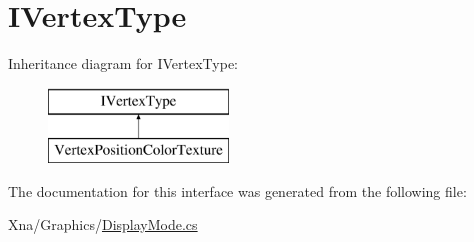 \hypertarget{interfaceMicrosoft_1_1Xna_1_1Framework_1_1Graphics_1_1IVertexType}{}\section{I\+Vertex\+Type}
\label{interfaceMicrosoft_1_1Xna_1_1Framework_1_1Graphics_1_1IVertexType}
Inheritance diagram for I\+Vertex\+Type\+:\begin{figure}[H]
\begin{center}
\leavevmode
\includegraphics[height=2.000000cm]{interfaceMicrosoft_1_1Xna_1_1Framework_1_1Graphics_1_1IVertexType}
\end{center}
\end{figure}


The documentation for this interface was generated from the following file\+:\begin{DoxyCompactItemize}
\item 
Xna/\+Graphics/\hyperlink{DisplayMode_8cs}{Display\+Mode.\+cs}\end{DoxyCompactItemize}
